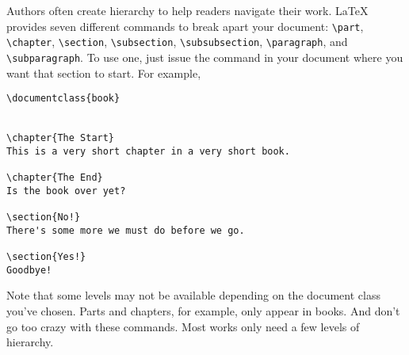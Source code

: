 Authors often create hierarchy to help readers navigate their work.
\LaTeX{} provides seven different commands to break apart your document:
\verb|\part|, \verb|\chapter|, \verb|\section|, \verb|\subsection|,
\verb|\subsubsection|, \verb|\paragraph|, and \verb|\subparagraph|.
To use one, just issue the command in your document where you want that section
to start.
For example,
\begin{leftfigure}
\begin{lstlisting}
\documentclass{book}


\chapter{The Start}
This is a very short chapter in a very short book.

\chapter{The End}
Is the book over yet?

\section{No!}
There's some more we must do before we go.

\section{Yes!}
Goodbye!

\end{lstlisting}
\end{leftfigure}
Note that some levels may not be available depending on the document class
you've chosen. Parts and chapters, for example, only appear in books.
And don't go too crazy with these commands.
Most works only need a few levels of hierarchy.

